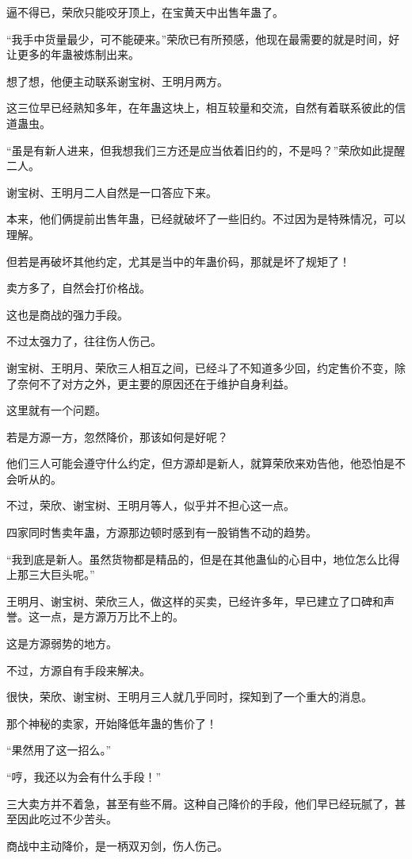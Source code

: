 \begin{this_body}
逼不得已，荣欣只能咬牙顶上，在宝黄天中出售年蛊了。

“我手中货量最少，可不能硬来。”荣欣已有所预感，他现在最需要的就是时间，好让更多的年蛊被炼制出来。

想了想，他便主动联系谢宝树、王明月两方。

这三位早已经熟知多年，在年蛊这块上，相互较量和交流，自然有着联系彼此的信道蛊虫。

“虽是有新人进来，但我想我们三方还是应当依着旧约的，不是吗？”荣欣如此提醒二人。

谢宝树、王明月二人自然是一口答应下来。

本来，他们俩提前出售年蛊，已经就破坏了一些旧约。不过因为是特殊情况，可以理解。

但若是再破坏其他约定，尤其是当中的年蛊价码，那就是坏了规矩了！

卖方多了，自然会打价格战。

这也是商战的强力手段。

不过太强力了，往往伤人伤己。

谢宝树、王明月、荣欣三人相互之间，已经斗了不知道多少回，约定售价不变，除了奈何不了对方之外，更主要的原因还在于维护自身利益。

这里就有一个问题。

若是方源一方，忽然降价，那该如何是好呢？

他们三人可能会遵守什么约定，但方源却是新人，就算荣欣来劝告他，他恐怕是不会听从的。

不过，荣欣、谢宝树、王明月等人，似乎并不担心这一点。

四家同时售卖年蛊，方源那边顿时感到有一股销售不动的趋势。

“我到底是新人。虽然货物都是精品的，但是在其他蛊仙的心目中，地位怎么比得上那三大巨头呢。”

王明月、谢宝树、荣欣三人，做这样的买卖，已经许多年，早已建立了口碑和声誉。这一点，是方源万万比不上的。

这是方源弱势的地方。

不过，方源自有手段来解决。

很快，荣欣、谢宝树、王明月三人就几乎同时，探知到了一个重大的消息。

那个神秘的卖家，开始降低年蛊的售价了！

“果然用了这一招么。”

“哼，我还以为会有什么手段！”

三大卖方并不着急，甚至有些不屑。这种自己降价的手段，他们早已经玩腻了，甚至因此吃过不少苦头。

商战中主动降价，是一柄双刃剑，伤人伤己。


\end{this_body}
